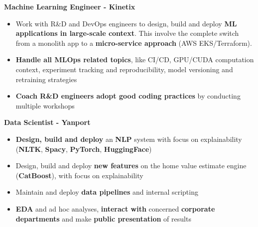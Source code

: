 \documentclass[a4paper,10pt]{article}
\begin{document}
\begin{adjustbox}{valign=t}
\begin{minipage}{0.6\textwidth}
\begin{description}
                \normalsize
            \item[\normalfont \textcolor{ColorOne}{Oct. 2022 -- Oct. 2023}]
                \textbf{Machine Learning Engineer - Kinetix}\\
                \small
                \begin{itemize}[topsep=0pt]
                    \item Work with R\&D and DevOps engineers to design, build and deploy \textbf{ML applications in large-scale context}. This involve the complete switch from a monolith app to a \textbf{micro-service approach} (AWS EKS/Terraform).
                    \item \textbf{Handle all MLOps related topics}, like CI/CD, GPU/CUDA computation context, experiment tracking and reproducibility, model versioning and retraining strategies
                    \item \textbf{Coach R\&D engineers adopt good coding practices} by conducting multiple workshops
                \end{itemize}
                \normalsize
            \item[\normalfont \textcolor{ColorOne}{Sep. 2021 -- Sep. 2022}]
                \textbf{Data Scientist - Yanport}\\
                \small
                \begin{itemize}[topsep=0pt]
                    \item \textbf{Design, build and deploy} an \textbf{NLP} system with focus on explainability (\textbf{NLTK}, \textbf{Spacy}, \textbf{PyTorch}, \textbf{HuggingFace})
                    \item Design, build and deploy \textbf{new features} on the home value estimate engine (\textbf{CatBoost}), with focus on explainability
                    \item Maintain and deploy \textbf{data pipelines} and internal scripting
                    \item \textbf{EDA} and ad hoc analyses, \textbf{interact with} concerned \textbf{corporate departments} and make \textbf{public presentation} of results
                \end{itemize}
                \normalsize
        \end{description}
        \vspace{-1cm}

\end{minipage}
\end{adjustbox}
\end{document}
